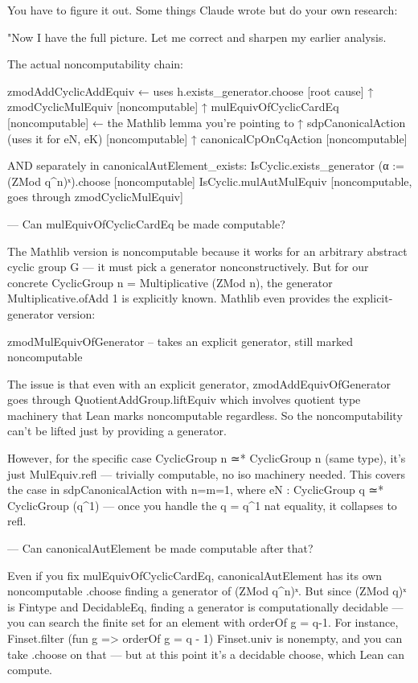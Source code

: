 You have to figure it out. Some things Claude wrote but do your own research:

"Now I have the full picture. Let me correct and sharpen my earlier analysis.

  The actual noncomputability chain:

  zmodAddCyclicAddEquiv  ← uses h.exists_generator.choose  [root cause]
    ↑
  zmodCyclicMulEquiv     [noncomputable]
    ↑
  mulEquivOfCyclicCardEq [noncomputable]  ← the Mathlib lemma you're pointing to
    ↑
  sdpCanonicalAction     (uses it for eN, eK)  [noncomputable]
    ↑
  canonicalCpOnCqAction  [noncomputable]

  AND separately in canonicalAutElement_exists:
  IsCyclic.exists_generator (α := (ZMod q^n)ˣ).choose  [noncomputable]
  IsCyclic.mulAutMulEquiv                                [noncomputable, goes through zmodCyclicMulEquiv]

  ---
  Can mulEquivOfCyclicCardEq be made computable?
  
  The Mathlib version is noncomputable because it works for an arbitrary abstract cyclic group G — it must pick a generator nonconstructively. But for our concrete CyclicGroup n = Multiplicative (ZMod n),
  the generator Multiplicative.ofAdd 1 is explicitly known. Mathlib even provides the explicit-generator version:

  zmodMulEquivOfGenerator  -- takes an explicit generator, still marked noncomputable

  The issue is that even with an explicit generator, zmodAddEquivOfGenerator goes through QuotientAddGroup.liftEquiv which involves quotient type machinery that Lean marks noncomputable regardless. So the
  noncomputability can't be lifted just by providing a generator.

  However, for the specific case CyclicGroup n ≃* CyclicGroup n (same type), it's just MulEquiv.refl — trivially computable, no iso machinery needed. This covers the case in sdpCanonicalAction with n=m=1,
  where eN : CyclicGroup q ≃* CyclicGroup (q^1) — once you handle the q = q^1 nat equality, it collapses to refl.

  ---
  Can canonicalAutElement be made computable after that?
  
  Even if you fix mulEquivOfCyclicCardEq, canonicalAutElement has its own noncomputable .choose finding a generator of (ZMod q^n)ˣ. But since (ZMod q)ˣ is Fintype and DecidableEq, finding a generator is 
  computationally decidable — you can search the finite set for an element with orderOf g = q-1. For instance, Finset.filter (fun g => orderOf g = q - 1) Finset.univ is nonempty, and you can take .choose on
  that — but at this point it's a decidable choose, which Lean can compute.

